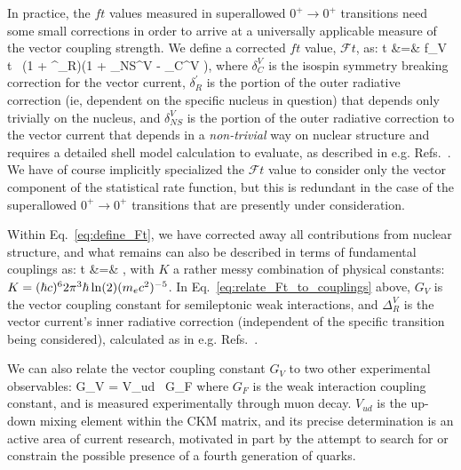 In practice, the $ft$ values measured in superallowed $0^+ \rightarrow 0^+$ transitions need some small corrections in order to arrive at a universally applicable measure of the vector coupling strength.  We define a corrected $ft$ value, $\mathcal{F}t$, as:
\bea
{}t &=& f_V t \, (1 + \delta^\prime_R)(1 + \delta_{NS}^V - \delta_C^{V} ),
\label{eq:define_Ft}
\eea
\color{skyblue}
where 
$\delta_C^{V}$ is the isospin symmetry breaking correction for the vector current, 
$\delta^\prime_R$ is the portion of the outer radiative correction (ie, dependent on the specific nucleus in question) that depends only trivially on the nucleus, 
and
$\delta_{NS}^{V}$ is the portion of the outer radiative correction %
to the vector current that depends in a \emph{non-trivial} way on nuclear structure and requires a detailed shell model calculation to evaluate, as described in e.g.  Refs.~\cite{TownerHardy2008}\cite{JausRasche1990}\cite{barker1992}\cite{Towner1992}\cite{Towner1994}.  
\color{black}
We have of course implicitly specialized the $\mathcal{F}t$ value to consider only the vector component of the statistical rate function, but this is redundant in the case of the superallowed $0^+ \rightarrow 0^+$ transitions that are presently under consideration.

Within Eq.~\ref{eq:define_Ft}, we have corrected away all contributions from nuclear structure, and what remains can also be described in terms of fundamental couplings as:
\bea
{}t &=& ,
\label{eq:relate_Ft_to_couplings}
\eea
\color{skyblue}
with $K$ a rather messy combination of physical constants: $K = (\hbar c)^6 2\pi^3 \hbar \ln(2) (m_e c^2)^{-5}$.  
%
In Eq.~\ref{eq:relate_Ft_to_couplings} above, $G_V$ is the vector coupling constant for semileptonic weak interactions, and 
%
$\Delta_R^{V}$ is the vector current's inner radiative correction (independent of the specific transition being considered), calculated as in e.g. Refs.~\cite{MarcianoSirlin_1986}\cite{MarcianoSirlin_2006}\cite{CzarneckiMarcianoSirlin_2019}.  %
\color{black}

\color{skyblue}
We can also relate the vector coupling constant $G_V$ to two other experimental observables:
\bea
G_V = V_{ud}  \, G_F
\label{eq:Vud_relate}
\eea
where $G_F$ is the weak interaction coupling constant, and is measured experimentally through muon decay.  
$V_{ud}$ is the up-down mixing element within the \ac{CKM} matrix, and its precise determination is an active area of current research, motivated in part by the attempt to search for or constrain the possible presence of a fourth generation of quarks. 
\color{black}

